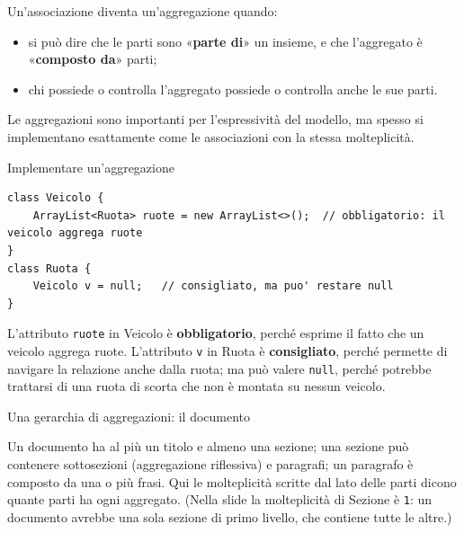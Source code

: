Un'associazione diventa un'aggregazione quando:
\begin{itemize}
  \item si può dire che le parti sono «\textbf{parte di}» un insieme, e che l'aggregato è «\textbf{composto da}» parti;
  \item chi possiede o controlla l'aggregato possiede o controlla anche le sue parti.
\end{itemize}
Le aggregazioni sono importanti per l'espressività del modello, ma spesso si implementano esattamente come le associazioni
con la stessa molteplicità.

\begin{esempio}{Implementare un'aggregazione}
\begin{lstlisting}[style=java]
class Veicolo {
    ArrayList<Ruota> ruote = new ArrayList<>();  // obbligatorio: il veicolo aggrega ruote
}
class Ruota {
    Veicolo v = null;   // consigliato, ma puo' restare null
}
\end{lstlisting}
L'attributo \texttt{ruote} in Veicolo è \textbf{obbligatorio}, perché esprime il fatto che un veicolo aggrega ruote.
L'attributo \texttt{v} in Ruota è \textbf{consigliato}, perché permette di navigare la relazione anche dalla ruota; ma può valere
\texttt{null}, perché potrebbe trattarsi di una ruota di scorta che non è montata su nessun veicolo.
\end{esempio}

\begin{esempio}{Una gerarchia di aggregazioni: il documento}
\begin{center}
\end{center}
Un documento ha al più un titolo e almeno una sezione; una sezione può contenere sottosezioni (aggregazione riflessiva) e
paragrafi; un paragrafo è composto da una o più frasi. Qui le molteplicità scritte dal lato delle parti dicono quante parti ha
ogni aggregato. (Nella slide la molteplicità di Sezione è \texttt{1}: un documento avrebbe una sola sezione di primo livello, che
contiene tutte le altre.)
\end{esempio}

